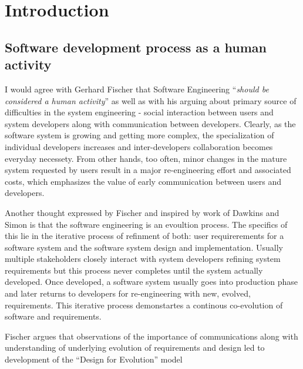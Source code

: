 \chapter{Introduction}

\section{Software development process as a human activity}
I would agree with Gerhard Fischer \cite{citeulike:4913213} that Software Engineering ``\textit{should be considered a human activity}'' as well as with his arguing about primary source of difficulties in the system engineering - social interaction between users and system developers along with communication between developers. Clearly, as the software system is growing and getting more complex, the specialization of individual developers increases and inter-developers collaboration becomes everyday necessety. From other hands, too often, minor changes in the mature system requested by users result in a major re-engineering effort and associated costs, which emphasizes the value of early communication between users and developers.

Another thought expressed by Fischer and inspired by work of Dawkins \cite{citeulike:606469} and Simon \cite{citeulike:143101} is that the software engineering is an evoultion process. The specifics of this lie in the iterative process of refinment of both: user requirerements for a software system and the software system design and implementation. Usually multiple stakeholders closely interact with system developers refining system requirements but this process never completes until the system actually developed. Once developed, a software system usually goes into production phase and later returns to developers for re-engineering with new, evolved, requirements. This iterative process demonstartes a continous co-evolution of software and requirements.

Fischer argues that observations of the importance of communications along with understanding of underlying evolution of requirements and design led to development of the ``Design for Evolution'' model


